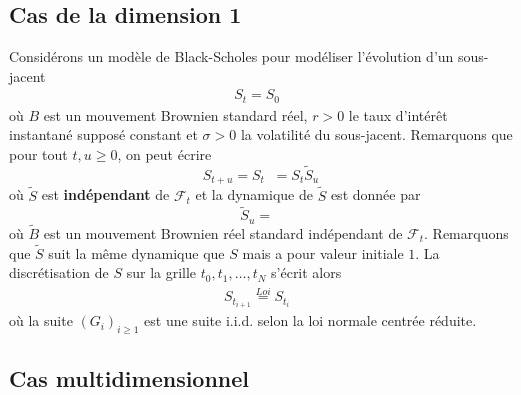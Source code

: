 \documentclass[a4paper,11pt]{article}
\def\cf{{\mathcal F}}
\def\expp#1{\mathop {\mathrm{e}^{ #1}}}
\begin{document}
\subsection{Cas de la dimension 1}
\label{bs1d}

Considérons un modèle de Black-Scholes pour modéliser l'évolution d'un sous-jacent
\begin{align*}
  S_t = S_0 \expp{(r - \sigma^2/2)t + \sigma B_t}
\end{align*}
où $B$ est un mouvement Brownien standard réel, $r>0$ le taux d'intérêt instantané supposé constant et $\sigma>0$ la volatilité du sous-jacent.  Remarquons que pour tout $t, u \ge 0$, on peut écrire
\begin{equation}
  \label{flot} S_{t+u} = S_{t} \expp{(r- \sigma^2/2) u + \sigma (B_{t+u} - B_t)}
  = S_t \tilde S_u
\end{equation}
où $\tilde S$ est {\bf indépendant} de $\cf_t$ et la dynamique de $\tilde S$ est donnée par
\begin{equation*}
  \tilde S_u = \expp{(r- \sigma^2/2) u + \sigma \tilde B_u}
\end{equation*}
où $\tilde B$ est un mouvement Brownien réel standard indépendant de $\cf_t$. Remarquons que $\tilde S$ suit la même dynamique que $S$ mais a pour valeur initiale $1$. La discrétisation de $S$ sur la grille $t_0, t_1, \dots, t_N$ s'écrit alors
\begin{align*}
  S_{t_{i+1}} \stackrel{Loi}{=} S_{t_i} \expp{(r - \sigma^2/2) (t_{i+1} - t_i) + \sigma \sqrt{t_{i+1} - t_i} G_{i+1}}
\end{align*}
où la suite $(G_i)_{i \ge 1}$ est une suite i.i.d. selon la loi normale centrée réduite.


\subsection{Cas multidimensionnel}
\label{bsnd}
\end{document}
